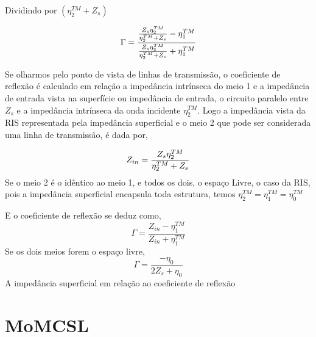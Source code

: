 \documentclass[
	12pt,				%
	openright,			%
	oneside,			%
	a4paper,			%
	english,			%
	brazil				%
	]{abntex2}
\begin{document}
\begin{apendicesenv}
Dividindo por $(\eta_2^{TM}+Z_s) $

\begin{equation}{\label{CoefReflexaoParaleloZsEta2}}
   \Gamma= \frac{\frac{Z_s \eta_2^{TM} }{\eta_2^{TM}+Z_s}-\eta_1^{TM}}
    {\frac{Z_s \eta_2^{TM} }{\eta_2^{TM}+Z_s}+\eta_1^{TM}}
\end{equation}

Se olharmos pelo ponto de vista de linhas de transmissão, o coeficiente de reflexão  é calculado em relação a impedância intrínseca do meio 1 e a impedância de entrada vista na superfície ou impedância de entrada, o circuito paralelo  entre $Z_s$ e a impedância intrínseca da onda incidente $\eta^{TM}_{2}$. Logo a impedância vista da RIS representada pela impedância superficial e o meio 2 que pode ser considerada uma linha de transmissão, é dada por,

\begin{equation}{\label{ImpedanciaZinParaleloZsEta2}}
   Z_{in}= \frac{Z_s \eta_2^{TM} }{\eta_2^{TM}+Z_s}
\end{equation}
Se o meio 2 é o idêntico ao meio 1, e todos os dois, o espaço Livre, o caso da RIS, pois a impedância superficial encapsula toda estrutura, temos $\eta^{TM}_{2}=\eta^{TM}_1=\eta^{TM}_0$

E o coeficiente de reflexão se deduz como,
\begin{equation}
   \Gamma= \frac{Z_{in}-\eta_1^{TM}}
    {Z_{in}+\eta_1^{TM}}
\end{equation}
Se os dois meios forem o espaço livre,
\begin{equation}
    \Gamma=\frac{-\eta_0}{2Z_s+\eta_0}
\end{equation}
A impedância superficial em relação ao coeficiente de reflexão

\chapter{MoMCSL}


\end{apendicesenv}
\end{document}
